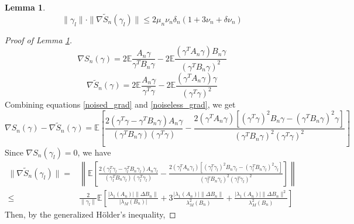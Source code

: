 \documentclass{article} \usepackage{iclr2019_conference,times}
\newtheorem{lemma}[theorem]{Lemma}
\newcommand{\expe}{\mathbb{E}}
\begin{document}
\begin{lemma}
\label{perturbation_gradient_nonasymptotic}
\begin{equation}
    \|\gamma_l \| \cdot \| \nabla \tilde{S}_n(\gamma_l)\| \leq 2 \mu_n \nu_n \delta_n (1 + 3 \nu_n + \delta \nu_n)
\end{equation}
\end{lemma}

\begin{proof}[Proof of Lemma \ref{perturbation_gradient_nonasymptotic}]
\begin{equation}
\label{noised_grad}
    \nabla S_n(\gamma) = 2 \expe \frac{A_n \gamma}{\gamma^T B_n \gamma} - 2 \expe \frac{(\gamma^T A_n \gamma) B_n \gamma}{(\gamma^T B_n \gamma)^2}
\end{equation}
\begin{equation}
\label{noiseless_grad}
    \nabla \tilde{S}_n(\gamma) = 2 \expe \frac{A_n \gamma}{\gamma^T \gamma} - 2 \expe \frac{(\gamma^T A_n \gamma) \gamma}{(\gamma^T \gamma)^2}
\end{equation}
Combining equations \ref{noised_grad} and \ref{noiseless_grad}, we get 
\begin{equation}
    \nabla S_n(\gamma) - \nabla \tilde{S}_n(\gamma) =
    \expe \left[ \frac{2 (\gamma^T \gamma - \gamma^T B_n \gamma) A_n \gamma}{(\gamma^T B_n \gamma)(\gamma^T \gamma)} - \frac{2 (\gamma^T A_n \gamma)[(\gamma^T \gamma)^2 B_n \gamma - (\gamma^T B_n \gamma)^2 \gamma]}{(\gamma^T B_n \gamma)^2 (\gamma^T \gamma)^2} \right]
\end{equation}
Since $\nabla S_n(\gamma_l) = 0$, we have 
\begin{equation}
    \begin{split}
        \| \nabla \tilde{S}_n(\gamma_l) \| =& \left\| \expe \left[ \frac{2 (\gamma_l^T \gamma_l - \gamma_l^T B_n \gamma_l) A_n \gamma_l}{(\gamma_l^T B_n \gamma_l)(\gamma_l^T \gamma_l)} - \frac{2 (\gamma_l^T A_n \gamma_l)[(\gamma_l^T \gamma_l)^2 B_n \gamma_l - (\gamma_l^T B_n \gamma_l)^2 \gamma_l]}{(\gamma_l^T B_n \gamma_l)^2 (\gamma_l^T \gamma_l)^2} \right] \right\| \\
        \leq& \frac{2}{\| \gamma_l \|} \expe \left[\frac{|\lambda_1(A_n)| \| \Delta B_n\|}{|\lambda_M(B_n)|} + 3 \frac{|\lambda_1(A_n)| \| \Delta B_n\|}{\lambda_M^2(B_n)} + \frac{|\lambda_1(A_n)| \| \Delta B_n\|^2}{\lambda_M^2(B_n)} \right]
    \end{split}
\end{equation}
Then, by the generalized H{\"o}lder's inequality,


\end{proof}
\end{document}
